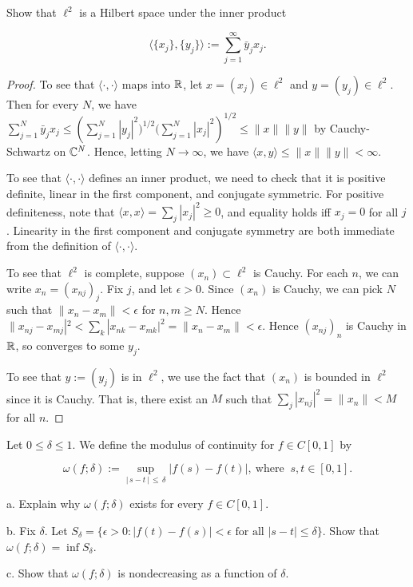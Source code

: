 \documentclass{article}
\begin{document}
 Show that $\ell^2$ is a Hilbert space under the inner product 

\[
\langle \{x_j\},\{y_j\} \rangle :=\sum_{j=1}^\infty \bar y_j x_j.
\]

\begin{proof}
To see that $\langle \cdot , \cdot \rangle$ maps into $\mathbb{R}$, let $x = (x_j) \in \ell^2$ and $y = (y_j) \in \ell^2$.  Then for every $N$, we have $\sum_{j=1}^N \bar y_j x_j \le \left( \sum_{j=1}^N |y_j|^2)^{1/2} (\sum_{j=1}^N |x_j|^2 \right)^{1/2} \le \|x\| \|y\|$ by Cauchy-Schwartz on $\mathbb{C}^N$.  Hence, letting $N \to \infty$, we have $\langle x, y \rangle \le \|x\| \|y\| < \infty$.

To see that $\langle \cdot, \cdot \rangle$ defines an inner product, we need to check that it is positive definite, linear in the first component, and conjugate symmetric.  For positive definiteness, note that $\langle x, x \rangle = \sum_j |x_j|^2 \ge 0$, and equality holds iff $x_j = 0$ for all $j$.  Linearity in the first component and conjugate symmetry are both immediate from the definition of $\langle \cdot, \cdot \rangle$.

To see that $\ell^2$ is complete, suppose $(x_n) \subset \ell^2$ is Cauchy.  For each $n$, we can write $x_n = (x_{nj})_j$.  Fix $j$, and let $\epsilon > 0$.  Since $(x_n)$ is Cauchy, we can pick $N$ such that $\|x_n - x_m \| < \epsilon$ for $n,m \ge N$.  Hence $\|x_{nj} - x_{mj}|^2 < \sum_k |x_{nk} - x_{mk}|^2 = \|x_n - x_m\| < \epsilon$.  Hence $(x_{nj})_n$ is Cauchy in $\mathbb{R}$, so converges to some $y_j$.  

To see that $y := (y_j)$ is in $\ell^2$, we use the fact that $(x_n)$ is bounded in $\ell^2$ since it is Cauchy.  That is, there exist an $M$ such that $\sum_j |x_{nj}|^2 = \|x_n\| < M$ for all $n$.  


\end{proof}

 Let $0\le \delta \le 1$. We define the modulus of continuity for
$f\in C[0,1]$ by

\[
\omega(f;\delta) := \sup_{|\,s-t\,|\,\le\, \delta}|f(s)-f(t)|,
  \ \text{where }\ s,t \in [0,1].
\]

a. Explain why $\omega(f;\delta)$ exists for every $f\in C[0,1]$.

b. Fix $\delta$. Let $S_\delta = \{ \epsilon > 0 : |f(t) - f(s)| < \epsilon \text{ for all } |s - t| \le \delta \}$.  Show that $\omega (f ; \delta) = \inf S_\delta$.

c. Show that $\omega(f ; \delta)$ is nondecreasing as a function of $\delta$.
\end{document}
